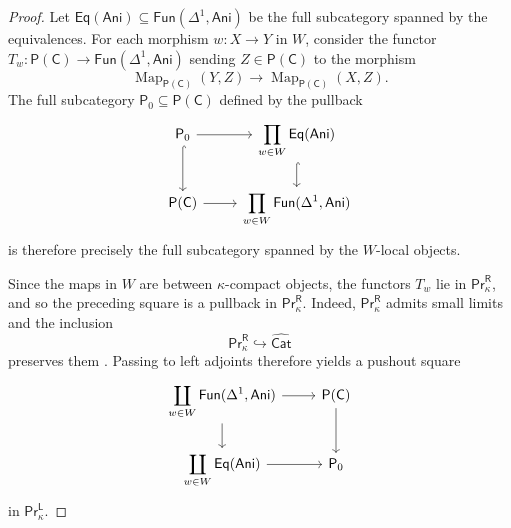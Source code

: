 \begin{proof}
Let $\mathsf{Eq}(\mathsf{Ani})\subseteq \mathsf{Fun}(\Delta^1,\mathsf{Ani})$ be the full subcategory spanned by the equivalences. For each morphism $w\colon X\to Y$ in $W$, consider the functor $T_w\colon \mathsf{P}(\mathsf{C})\to \mathsf{Fun}(\Delta^1,\mathsf{Ani})$ sending $Z\in\mathsf{P}(\mathsf{C})$ to the morphism
\[\operatorname{Map}_{\mathsf{P}(\mathsf{C})}(Y,Z)\to \operatorname{Map}_{\mathsf{P}(\mathsf{C})}(X,Z).\]
The full subcategory $\mathsf{P}_0\subseteq\mathsf{P}(\mathsf{C})$ defined by the pullback
\[\begin{tikzcd}[ampersand replacement=\&]
	{\mathsf{P}_0} \& {\displaystyle\prod_{w\in W}\mathsf{Eq}(\mathsf{Ani})} \\
	{\mathsf{P}(\mathsf{C})} \& {\displaystyle\prod_{w\in W}\mathsf{Fun}(\Delta^1,\mathsf{Ani})}
	\arrow[from=1-1, to=1-2]
	\arrow[hook, from=1-1, to=2-1]
	\arrow[hook, from=1-2, to=2-2]
	\arrow[from=2-1, to=2-2]
\end{tikzcd}\]
is therefore precisely the full subcategory spanned by the $W$-local objects.

Since the maps in $W$ are between $\kappa$-compact objects, the functors $T_w$ lie in $\mathsf{Pr}^\mathsf{R}_\kappa$, and so the preceding square is a pullback in $\mathsf{Pr}^\mathsf{R}_\kappa$. Indeed, $\mathsf{Pr}^\mathsf{R}_\kappa$ admits small limits and the inclusion
\[\mathsf{Pr}^\mathsf{R}_\kappa\hookrightarrow\widehat{\mathsf{Cat}}\]
preserves them \cite[Prop.~5.5.7.6]{lurie2009HTT}. Passing to left adjoints therefore yields a pushout square
\[\begin{tikzcd}[ampersand replacement=\&]
	{\displaystyle\coprod_{w\in W}\mathsf{Fun}(\Delta^1,\mathsf{Ani})} \& {\mathsf{P}(\mathsf{C})} \\
	{\displaystyle\coprod_{w\in W}\mathsf{Eq}(\mathsf{Ani})} \& {\mathsf{P}_0}
	\arrow[from=1-1, to=1-2]
	\arrow[from=1-1, to=2-1]
	\arrow[from=1-2, to=2-2]
	\arrow[from=2-1, to=2-2]
\end{tikzcd}\]
in $\mathsf{Pr}^\mathsf{L}_\kappa$.


\end{proof}

